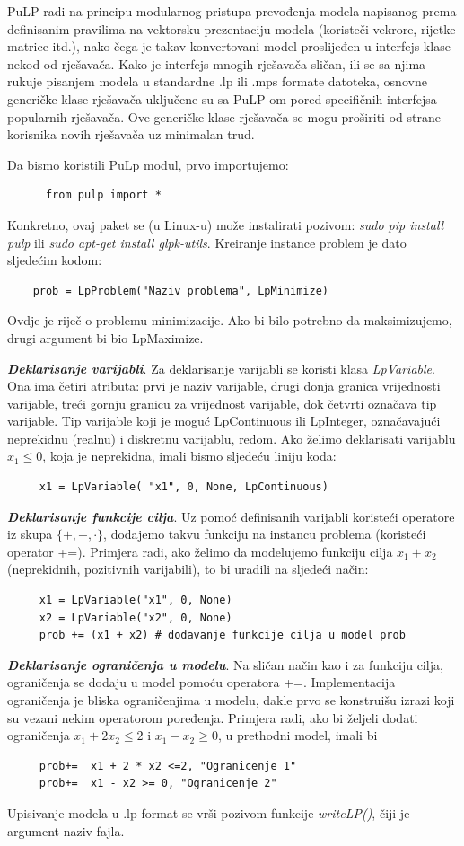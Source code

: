 \documentclass[a4paper, utf8, 11pt, colorlinks]{book}
\begin{document}
 PuLP radi na principu modularnog pristupa prevođenja modela napisanog prema definisanim pravilima na vektorsku prezentaciju modela (koristeči vekrore, rijetke matrice itd.), nako čega je takav konvertovani model proslijeđen u interfejs klase nekod od rješavača. Kako je interfejs mnogih rješavača sličan, ili se sa njima rukuje pisanjem modela u standardne .lp ili .mps  formate datoteka, osnovne generičke klase rješavača uključene su sa PuLP-om pored specifičnih interfejsa popularnih rješavača. Ove generičke klase rješavača se mogu proširiti od strane korisnika novih rješavača uz minimalan trud.   
 
 Da bismo koristili PuLp modul, prvo importujemo:
 \begin{verbatim}
 	  from pulp import *
 \end{verbatim}
 Konkretno, ovaj paket se (u Linux-u) može instalirati pozivom: \emph{sudo pip install pulp} ili \emph{sudo apt-get install glpk-utils}. 
 Kreiranje instance problem je dato sljedećim kodom:
 \begin{verbatim}
 	prob = LpProblem("Naziv problema", LpMinimize)
 \end{verbatim}
Ovdje je   riječ o problemu minimizacije. Ako bi bilo potrebno da maksimizujemo, drugi argument bi bio 
LpMaximize. 

\textbf{\emph{Deklarisanje varijabli}}.  Za deklarisanje varijabli se koristi klasa \emph{LpVariable}. Ona ima četiri atributa: prvi je naziv varijable, drugi donja granica vrijednosti varijable, treći gornju granicu za vrijednost varijable, dok četvrti označava tip varijable. Tip varijable koji je moguć LpContinuous ili LpInteger, označavajući neprekidnu (realnu) i diskretnu varijablu, redom.  
Ako želimo deklarisati varijablu $x_1\leq 0$, koja je neprekidna, imali bismo sljedeću liniju koda:
\begin{verbatim}
	 x1 = LpVariable( "x1", 0, None, LpContinuous)
\end{verbatim}
\textbf{\emph{Deklarisanje funkcije cilja}}. Uz pomoć definisanih varijabli koristeći operatore iz skupa $\{+,-, \cdot \}$, dodajemo takvu funkciju na instancu problema (koristeći operator +=). Primjera radi, ako želimo da modelujemo funkciju cilja $x_1 + x_2$ (neprekidnih, pozitivnih varijabili), to bi uradili na sljedeći način:
\begin{verbatim}
	 x1 = LpVariable("x1", 0, None)
	 x2 = LpVariable("x2", 0, None) 
	 prob += (x1 + x2) # dodavanje funkcije cilja u model prob
\end{verbatim}  
\textbf{\emph{Deklarisanje ograničenja u modelu}}.  Na sličan način kao i za funkciju cilja, ograničenja se dodaju u model pomoću operatora +=. Implementacija ograničenja je bliska ograničenjima u modelu, dakle prvo se konstruišu izrazi koji su vezani nekim operatorom poređenja. Primjera radi, ako bi željeli dodati ograničenja $x_1 + 2 x_2 \leq 2$ i $x_1-x_2 \geq 0$,  u prethodni model, imali bi 
\begin{verbatim}
	 prob+=  x1 + 2 * x2 <=2, "Ogranicenje 1"
	 prob+=  x1 - x2 >= 0, "Ogranicenje 2" 
\end{verbatim}
Upisivanje modela u .lp format se vrši pozivom funkcije \emph{writeLP()}, čiji je argument naziv fajla. 
\end{document}
